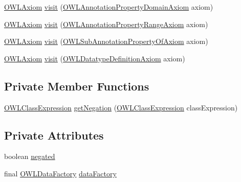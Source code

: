 \begin{DoxyCompactItemize}
\item 
\hyperlink{interfaceorg_1_1semanticweb_1_1owlapi_1_1model_1_1_o_w_l_axiom}{O\-W\-L\-Axiom} \hyperlink{classorg_1_1semanticweb_1_1owlapi_1_1util_1_1_n_n_f_a13babfad70f893a406b48d9468a402e1}{visit} (\hyperlink{interfaceorg_1_1semanticweb_1_1owlapi_1_1model_1_1_o_w_l_annotation_property_domain_axiom}{O\-W\-L\-Annotation\-Property\-Domain\-Axiom} axiom)
\item 
\hyperlink{interfaceorg_1_1semanticweb_1_1owlapi_1_1model_1_1_o_w_l_axiom}{O\-W\-L\-Axiom} \hyperlink{classorg_1_1semanticweb_1_1owlapi_1_1util_1_1_n_n_f_ad8ee1b4dfecbdf5bc159699f479ac58b}{visit} (\hyperlink{interfaceorg_1_1semanticweb_1_1owlapi_1_1model_1_1_o_w_l_annotation_property_range_axiom}{O\-W\-L\-Annotation\-Property\-Range\-Axiom} axiom)
\item 
\hyperlink{interfaceorg_1_1semanticweb_1_1owlapi_1_1model_1_1_o_w_l_axiom}{O\-W\-L\-Axiom} \hyperlink{classorg_1_1semanticweb_1_1owlapi_1_1util_1_1_n_n_f_af92190863e81652420716921035a0cf9}{visit} (\hyperlink{interfaceorg_1_1semanticweb_1_1owlapi_1_1model_1_1_o_w_l_sub_annotation_property_of_axiom}{O\-W\-L\-Sub\-Annotation\-Property\-Of\-Axiom} axiom)
\item 
\hyperlink{interfaceorg_1_1semanticweb_1_1owlapi_1_1model_1_1_o_w_l_axiom}{O\-W\-L\-Axiom} \hyperlink{classorg_1_1semanticweb_1_1owlapi_1_1util_1_1_n_n_f_aa1d0231ea0991ed19f1ede69b2100555}{visit} (\hyperlink{interfaceorg_1_1semanticweb_1_1owlapi_1_1model_1_1_o_w_l_datatype_definition_axiom}{O\-W\-L\-Datatype\-Definition\-Axiom} axiom)
\end{DoxyCompactItemize}
\subsection*{Private Member Functions}
\begin{DoxyCompactItemize}
\item 
\hyperlink{interfaceorg_1_1semanticweb_1_1owlapi_1_1model_1_1_o_w_l_class_expression}{O\-W\-L\-Class\-Expression} \hyperlink{classorg_1_1semanticweb_1_1owlapi_1_1util_1_1_n_n_f_a3905651fe44b8c392b892adf3e6ce1d1}{get\-Negation} (\hyperlink{interfaceorg_1_1semanticweb_1_1owlapi_1_1model_1_1_o_w_l_class_expression}{O\-W\-L\-Class\-Expression} class\-Expression)
\end{DoxyCompactItemize}
\subsection*{Private Attributes}
\begin{DoxyCompactItemize}
\item 
boolean \hyperlink{classorg_1_1semanticweb_1_1owlapi_1_1util_1_1_n_n_f_a3b58af76e39ff232e1bde5c6c7e1a65f}{negated}
\item 
final \hyperlink{interfaceorg_1_1semanticweb_1_1owlapi_1_1model_1_1_o_w_l_data_factory}{O\-W\-L\-Data\-Factory} \hyperlink{classorg_1_1semanticweb_1_1owlapi_1_1util_1_1_n_n_f_a70dd87e790a58dfa63bca8ca8cfe2d56}{data\-Factory}
\end{DoxyCompactItemize}


